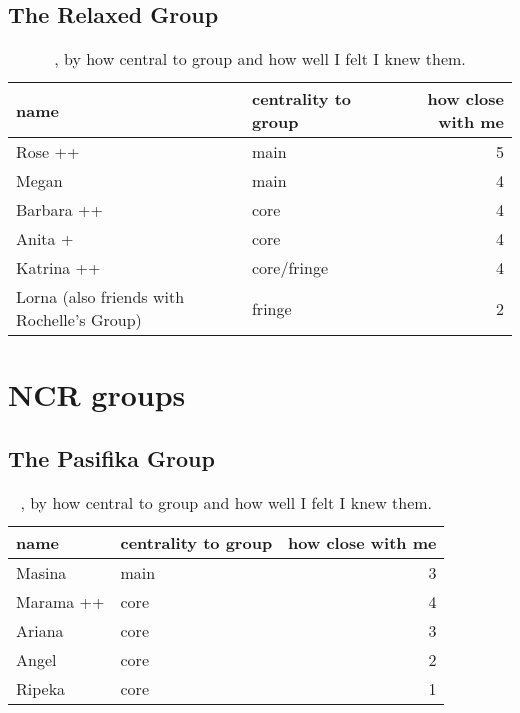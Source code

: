 \subsection{The Relaxed Group}
\nopagebreak
\begin{table}[ht]
\caption{, by how central to group and how well I felt I knew them.}	\label{append:Relaxed}
	\centering
		\begin{tabular}{llr} \\
		\hline
							name & centrality to group & how close with me  \\
			\hline
Rose ++ & main & 5 \\
Megan & main & 4 \\
Barbara ++ & core & 4 \\
Anita + & core & 4 \\
Katrina ++ & core/fringe & 4 \\
Lorna (also friends with Rochelle's Group) & fringe & 2 \\
   \hline
		\end{tabular}
\end{table}
\mbox{}

\pagebreak




\bigskip

\pagebreak
\section{NCR groups}
\nopagebreak
\subsection{The Pasifika Group}
\nopagebreak
\begin{table}[ht]
\caption{, by how central to group and how well I felt I knew them.}\label{append:Pasifika}
	\centering
		\begin{tabular}{llr} \\
		\hline
					name & centrality to group & how close with me  \\
			\hline
Masina & main & 3 \\
Marama ++ & core & 4 \\
Ariana & core & 3 \\
Angel  & core & 2 \\
Ripeka & core & 1 \\
   \hline
				\end{tabular}
\end{table}


